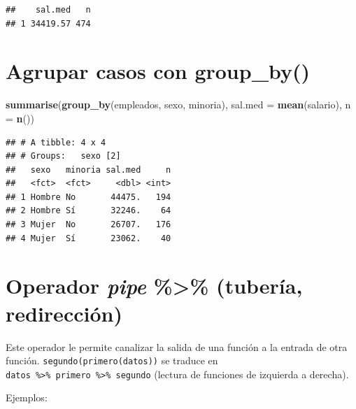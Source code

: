 \documentclass[]{book}
\newenvironment{Shaded}{\begin{snugshade}}{\end{snugshade}}
\newcommand{\KeywordTok}[1]{\textcolor[rgb]{0.13,0.29,0.53}{\textbf{#1}}}
\newcommand{\DataTypeTok}[1]{\textcolor[rgb]{0.13,0.29,0.53}{#1}}
\newcommand{\StringTok}[1]{\textcolor[rgb]{0.31,0.60,0.02}{#1}}
\newcommand{\OperatorTok}[1]{\textcolor[rgb]{0.81,0.36,0.00}{\textbf{#1}}}
\newcommand{\NormalTok}[1]{#1}
\begin{document}
\begin{verbatim}
##    sal.med   n
## 1 34419.57 474
\end{verbatim}

\section{\texorpdfstring{Agrupar casos con
\textbf{group\_by()}}{Agrupar casos con group\_by()}}\label{agrupar-casos-con-group_by}

\begin{Shaded}
\begin{Highlighting}[]
\KeywordTok{summarise}\NormalTok{(}\KeywordTok{group_by}\NormalTok{(empleados, sexo, minoria), }\DataTypeTok{sal.med =} \KeywordTok{mean}\NormalTok{(salario), }\DataTypeTok{n =} \KeywordTok{n}\NormalTok{())}
\end{Highlighting}
\end{Shaded}

\begin{verbatim}
## # A tibble: 4 x 4
## # Groups:   sexo [2]
##   sexo   minoria sal.med     n
##   <fct>  <fct>     <dbl> <int>
## 1 Hombre No       44475.   194
## 2 Hombre Sí       32246.    64
## 3 Mujer  No       26707.   176
## 4 Mujer  Sí       23062.    40
\end{verbatim}

\section{\texorpdfstring{Operador \emph{pipe} \textbf{\%\textgreater{}\%
}(tubería,
redirección)}{Operador pipe \%\textgreater{}\% (tubería, redirección)}}\label{operador-pipe-tuberia-redireccion}

Este operador le permite canalizar la salida de una función a la entrada
de otra función. \texttt{segundo(primero(datos))} se traduce en
\texttt{datos\ \%\textgreater{}\%\ primero\ \%\textgreater{}\%\ segundo}
(lectura de funciones de izquierda a derecha).

Ejemplos:

\begin{Shaded}
\end{Shaded}
\end{document}
